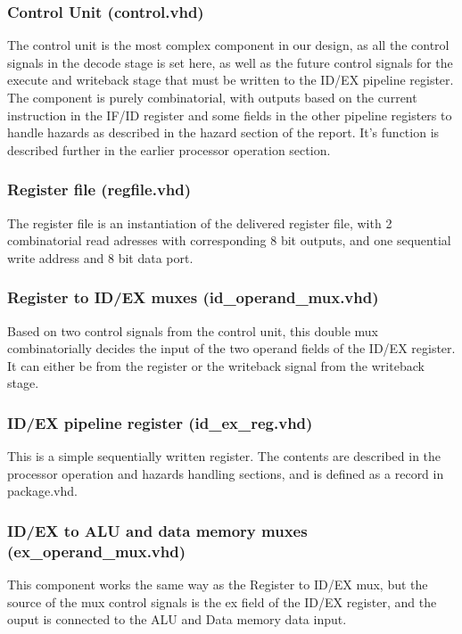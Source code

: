 \documentclass[11pt]{report}
\begin{document}
\subsubsection*{Control Unit (control.vhd)}

The control unit is the most complex component in our design, as all the control
signals in the decode stage is set here, as well as the future control signals for
the execute and writeback stage that must be written to the ID/EX pipeline register.
The component is purely combinatorial, with outputs based on the current instruction in the
IF/ID register and some fields in the other pipeline registers to handle hazards as
described in the hazard section of the report. It's function is described further in the 
earlier processor operation section.

\subsubsection*{Register file (regfile.vhd)}
The register file is an instantiation of the delivered register file, with 
2 combinatorial read adresses with corresponding 8 bit outputs, and one sequential
write address and 8 bit data port.

\subsubsection*{Register to ID/EX muxes (id\_operand\_mux.vhd)}
Based on two control signals from the control unit, this double mux combinatorially
decides the input of the two operand fields of the ID/EX register. It can 
either be from the register or the writeback signal from the writeback stage.

\subsubsection*{ID/EX pipeline register (id\_ex\_reg.vhd)}
This is a simple sequentially written register. The contents are described in the 
processor operation and hazards handling sections, and is defined as a record in package.vhd. 
\subsubsection*{ID/EX to ALU and data memory muxes (ex\_operand\_mux.vhd)}
This component works the same way as the Register to ID/EX mux, but the source of the 
mux control signals is the ex field of the ID/EX register, and the ouput is connected
to the ALU and Data memory data input.
\end{document}
